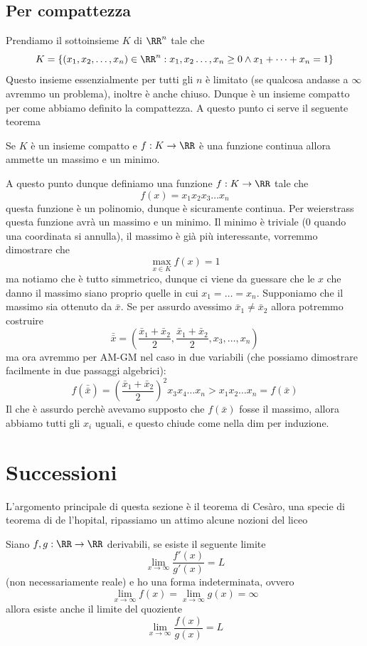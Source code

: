 \documentclass[11pt]{scrartcl}
\begin{document}
  	\subsection{Per compattezza}
  	Prendiamo il sottoinsieme $K$ di $\RR^n$ tale che
  	$$K=\left\{(x_1,x_2,\dots,x_n)\in\RR^n:x_1,x_2\dots,x_n\ge 0 \land x_1+\dots+x_n=1\right\}$$
  	Questo insieme essenzialmente per tutti gli $n$ è limitato (se qualcosa andasse a $\infty$ avremmo un problema), inoltre è anche chiuso. Dunque è un insieme compatto per come abbiamo definito la compattezza. A questo punto ci serve il seguente teorema
  	\begin{theorem}[Weierstrass]
  		Se $K$ è un insieme compatto e $f:K\to\RR$ è una funzione continua allora ammette un massimo e un minimo.
  	\end{theorem}
  	A questo punto dunque definiamo una funzione $f:K\to\RR$ tale che
  	$$f(x)=x_1x_2x_3\dots x_n$$
  	questa funzione è un polinomio, dunque è sicuramente continua. Per weierstrass questa funzione avrà un massimo e un minimo. Il minimo è triviale ($0$ quando una coordinata si annulla), il massimo è già più interessante, vorremmo dimostrare che 
  	$$\max_{x\in K}f(x)=1$$
  	ma notiamo che è tutto simmetrico, dunque ci viene da guessare che le $x$ che danno il massimo siano proprio quelle in cui $x_1=\dots=x_n$. Supponiamo che il massimo sia ottenuto da $\bar{x}$. Se per assurdo avessimo $\bar{x}_1\ne \bar{x}_2$ allora potremmo costruire
  	$$\bar{\bar{x}}=\left(\frac{\bar{x}_1+\bar{x}_2}{2},\frac{\bar{x}_1+\bar{x}_2}{2},x_3,\dots,x_n\right)$$
  	ma ora avremmo per AM-GM nel caso in due variabili (che possiamo dimostrare facilmente in due passaggi algebrici):
  	$$f(\bar{\bar{x}})=\left(\frac{\bar{x}_1+\bar{x}_2}{2}\right)^2x_3x_4\dots x_n>x_1x_2\dots x_n=f(\bar{x})$$
  	Il che è assurdo perchè avevamo supposto che $f(\bar{x})$ fosse il massimo, allora abbiamo tutti gli $x_i$ uguali, e questo chiude come nella dim per induzione.
  	
  	\newpage
  	
  	\section{Successioni}
  	
  	L'argomento principale di questa sezione è il teorema di Cesàro, una specie di teorema di de l'hopital, ripassiamo un attimo alcune nozioni del liceo
  	\begin{theorem}[De L'Hopital]
  		Siano $f,g:\RR\to\RR$ derivabili, se esiste il seguente limite
  		$$\lim_{x\to\infty}\frac{f'(x)}{g'(x)}=L$$
  		(non necessariamente reale) e ho una forma indeterminata, ovvero 
  		$$\lim_{x\to\infty}f(x)=\lim_{x\to\infty}g(x)=\infty$$
  		allora esiste anche il limite del quoziente
  		$$\lim_{x\to\infty}\frac{f(x)}{g(x)}=L$$
  	\end{theorem}
  	
\end{document}

